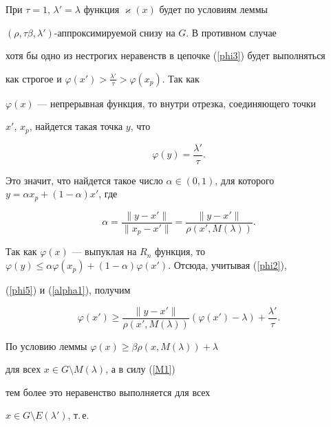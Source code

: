 \begin{pf}
При $\tau=1$, $\lambda'=\lambda$ функция $\varkappa(x)$ будет по условиям леммы


$(\rho,\tau\beta,\lambda')$-аппроксимируемой снизу на $G$. В противном случае


хотя бы одно из нестрогих неравенств в цепочке (\ref{phi3}) будет выполняться


как строгое и $\varphi(x')>\frac{\lambda'}{\tau}>\varphi(x_p)$. Так как


$\varphi(x)$ --- непрерывная функция, то внутри отрезка, соединяющего точки


$x'$, $x_p$, найдется такая точка $y$, что


\begin{equation}\label{phi5}


\varphi(y)=\frac{\lambda'}{\tau}.


\end{equation}


Это значит, что найдется такое число $\alpha\in(0,1)$, для которого $y=\alpha


x_p + (1-\alpha)x'$, где


\begin{equation}\label{alpha1}


\alpha=\frac{\|y-x'\|}{\|x_p-x'\|}=\frac{\|y-x'\|}{\rho(x',M(\lambda))}.


\end{equation}


Так как $\varphi(x)$ --- выпуклая на $R_n$ функция, то $\varphi(y)\leq\alpha


\varphi(x_p) + (1-\alpha)\varphi(x')$. Отсюда, учитывая (\ref{phi2}),


(\ref{phi5}) и (\ref{alpha1}), получим


\begin{equation}\label{alpha2}


\varphi(x')\geq\frac{\|y-x'\|}{\rho(x',M(\lambda))}


(\varphi(x')-\lambda)+\frac{\lambda'}{\tau}.


\end{equation}


По условию леммы $\varphi(x)\geq\beta\rho(x,M(\lambda))+\lambda$ 


для всех $x\in G\setminus M(\lambda)$, а в силу (\ref{M1})


тем более это неравенство выполняется для всех


$x\in G\setminus E(\lambda')$, т.\,е.


\begin{equation}\label{phi6}



\end{equation}
\end{pf}
